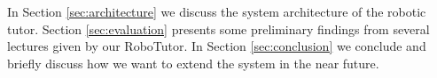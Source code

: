 
In Section \ref{sec:architecture} we discuss the system architecture of the robotic tutor. Section \ref{sec:evaluation} presents some preliminary findings from several lectures given by our RoboTutor. In Section \ref{sec:conclusion} we conclude and briefly discuss how we want to extend the system in the near future.

